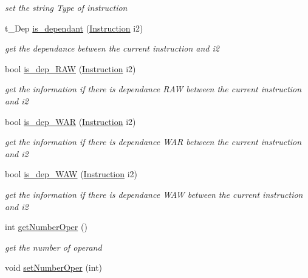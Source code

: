 \begin{DoxyCompactItemize}
\begin{DoxyCompactList}\small\item\em set the string Type of instruction \item\end{DoxyCompactList}\item 
t\_\-Dep \hyperlink{classInstruction_a7e93717c1e9df6fed09105accb6c728c}{is\_\-dependant} (\hyperlink{classInstruction}{Instruction} i2)
\begin{DoxyCompactList}\small\item\em get the dependance between the current instruction and i2 \item\end{DoxyCompactList}\item 
bool \hyperlink{classInstruction_a757d13233614f3b81f340275e0ac03fc}{is\_\-dep\_\-RAW} (\hyperlink{classInstruction}{Instruction} i2)
\begin{DoxyCompactList}\small\item\em get the information if there is dependance RAW between the current instruction and i2 \item\end{DoxyCompactList}\item 
bool \hyperlink{classInstruction_a22c2bbac305649d7f0ec17a04ef217fc}{is\_\-dep\_\-WAR} (\hyperlink{classInstruction}{Instruction} i2)
\begin{DoxyCompactList}\small\item\em get the information if there is dependance WAR between the current instruction and i2 \item\end{DoxyCompactList}\item 
bool \hyperlink{classInstruction_a6fd4dd46f540f0674486d559c1fbcd57}{is\_\-dep\_\-WAW} (\hyperlink{classInstruction}{Instruction} i2)
\begin{DoxyCompactList}\small\item\em get the information if there is dependance WAW between the current instruction and i2 \item\end{DoxyCompactList}\item 
int \hyperlink{classInstruction_a3278668f293095ccb1565f36894a117e}{getNumberOper} ()
\begin{DoxyCompactList}\small\item\em get the number of operand \item\end{DoxyCompactList}\item 
\hypertarget{classInstruction_a748889b83c25f1e791fbbc44d2414f99}{
void \hyperlink{classInstruction_a748889b83c25f1e791fbbc44d2414f99}{setNumberOper} (int)}
\label{classInstruction_a748889b83c25f1e791fbbc44d2414f99}


\end{DoxyCompactItemize}
